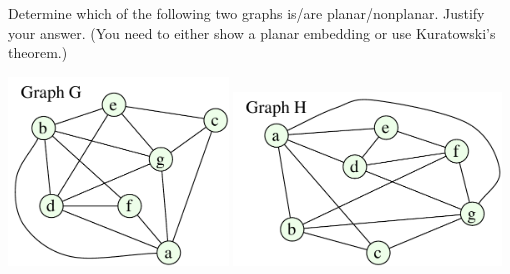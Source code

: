 \documentclass{article}
\begin{document}


\begin{problem}
Determine which of the following two graphs is/are planar/nonplanar.
Justify your answer. (You need to either show a planar embedding or
use Kuratowski's theorem.)

	\begin{center}
		\includegraphics[width = 2.3in]{HW5_pics/graphGa_hw5.pdf}
		\hfill
		\includegraphics[width = 2.8in]{HW5_pics/graphHa_hw5.pdf}
	\end{center}

\end{problem}
\end{document}
